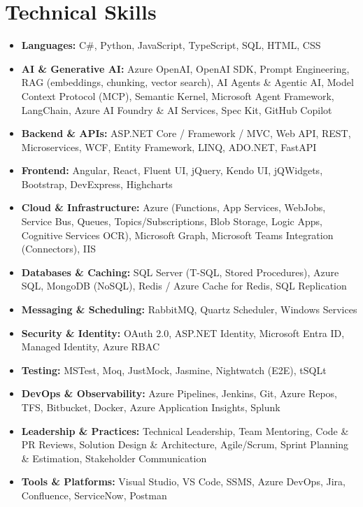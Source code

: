 \documentclass[10pt,a4paper]{article}
\begin{document}
\section{Technical Skills}
\small
{}
\begin{itemize}[label={}]
    \item \textbf{Languages:} C\#, Python, JavaScript, TypeScript, SQL, HTML, CSS
    \item \textbf{AI \& Generative AI:} Azure OpenAI, OpenAI SDK, Prompt Engineering, RAG (embeddings, chunking, vector search), AI Agents \& Agentic AI, Model Context Protocol (MCP), Semantic Kernel, Microsoft Agent Framework, LangChain, Azure AI Foundry \& AI Services, Spec Kit, GitHub Copilot
    \item \textbf{Backend \& APIs:} ASP.NET Core / Framework / MVC, Web API, REST, Microservices, WCF, Entity Framework, LINQ, ADO.NET, FastAPI
    \item \textbf{Frontend:} Angular, React, Fluent UI, jQuery, Kendo UI, jQWidgets, Bootstrap, DevExpress, Highcharts
    \item \textbf{Cloud \& Infrastructure:} Azure (Functions, App Services, WebJobs, Service Bus, Queues, Topics/Subscriptions, Blob Storage, Logic Apps, Cognitive Services OCR), Microsoft Graph, Microsoft Teams Integration (Connectors), IIS
    \item \textbf{Databases \& Caching:} SQL Server (T-SQL, Stored Procedures), Azure SQL, MongoDB (NoSQL), Redis / Azure Cache for Redis, SQL Replication
    \item \textbf{Messaging \& Scheduling:} RabbitMQ, Quartz Scheduler, Windows Services
    \item \textbf{Security \& Identity:} OAuth 2.0, ASP.NET Identity, Microsoft Entra ID, Managed Identity, Azure RBAC
    \item \textbf{Testing:} MSTest, Moq, JustMock, Jasmine, Nightwatch (E2E), tSQLt
    \item \textbf{DevOps \& Observability:} Azure Pipelines, Jenkins, Git, Azure Repos, TFS, Bitbucket, Docker, Azure Application Insights, Splunk
    \item \textbf{Leadership \& Practices:} Technical Leadership, Team Mentoring, Code \& PR Reviews, Solution Design \& Architecture, Agile/Scrum, Sprint Planning \& Estimation, Stakeholder Communication
    \item \textbf{Tools \& Platforms:} Visual Studio, VS Code, SSMS, Azure DevOps, Jira, Confluence, ServiceNow, Postman
\end{itemize}
\normalsize
{}
\end{document}
